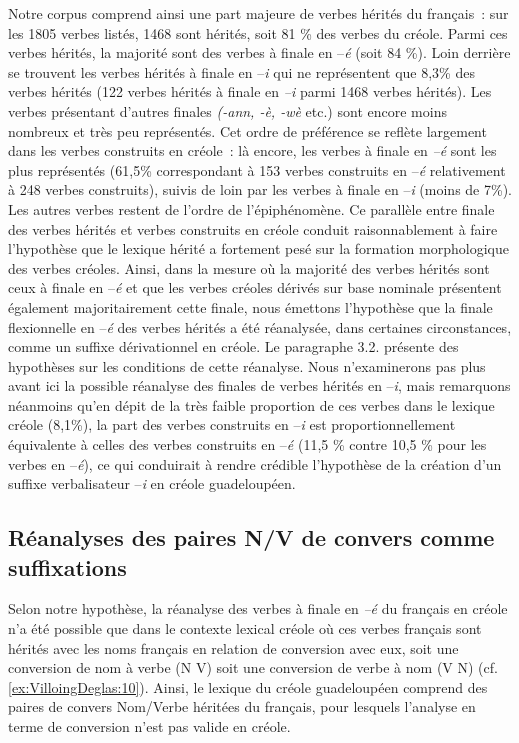 \documentclass[output=paper]{langsci/langscibook}
\begin{document}
Notre corpus comprend ainsi une part majeure de verbes hérités du
français~: sur les 1805 verbes listés, 1468 sont hérités, soit 81 \% des
verbes du créole. Parmi ces verbes hérités, la majorité sont des verbes
à finale en --\emph{é} (soit 84 \%). Loin derrière se trouvent les
verbes hérités à finale en --\emph{i} qui ne représentent que 8,3\% des
verbes hérités (122 verbes hérités à finale en \emph{--i }parmi 1468
verbes hérités). Les verbes présentant d'autres finales \emph{(-ann, -è,
-wè} etc.) sont encore moins nombreux et très peu représentés. Cet ordre
de préférence se reflète largement dans les verbes construits en
créole~: là encore, les verbes à finale en \emph{--é} sont les plus
représentés (61,5\% correspondant à 153 verbes construits en --\emph{é
}relativement à 248 verbes construits), suivis de loin par les verbes à
finale en --\emph{i} (moins de 7\%). Les autres verbes restent de
l'ordre de l'épiphénomène. Ce parallèle entre finale des verbes hérités
et verbes construits en créole conduit raisonnablement à faire
l'hypothèse que le lexique hérité a fortement pesé sur la formation
morphologique des verbes créoles. Ainsi, dans la mesure où la majorité
des verbes hérités sont ceux à finale en --\emph{é} et que les verbes
créoles dérivés sur base nominale présentent également majoritairement
cette finale, nous émettons l'hypothèse que la finale flexionnelle en
--\emph{é} des verbes hérités a été réanalysée, dans certaines
circonstances, comme un suffixe dérivationnel en créole. Le paragraphe
3.2. présente des hypothèses sur les conditions de cette réanalyse. Nous
n'examinerons pas plus avant ici la possible réanalyse des finales de
verbes hérités en --\emph{i}, mais remarquons néanmoins qu'en dépit de
la très faible proportion de ces verbes dans le lexique créole (8,1\%),
la part des verbes construits en --\emph{i} est proportionnellement
équivalente à celles des verbes construits en --\emph{é} (11,5 \% contre
10,5 \% pour les verbes en --\emph{é}), ce qui conduirait à rendre
crédible l'hypothèse de la création d'un suffixe verbalisateur
--\emph{i} en créole guadeloupéen.

\subsection{Réanalyses des paires N/V de convers comme
suffixations}\label{subsection:VilloingDeglas:réanalyses-des-paires-nv-de-convers-comme-suffixations}

Selon notre hypothèse, la réanalyse des verbes à finale en \emph{--é} du
français en créole n'a été possible que dans le contexte lexical créole
où ces verbes français sont hérités avec les noms français en relation
de conversion avec eux, soit une conversion de nom à verbe (N\textrightarrow{} V) soit
une conversion de verbe à nom (V\textrightarrow{} N) (cf. \ref{ex:VilloingDeglas:10}). Ainsi, le lexique du
créole guadeloupéen comprend des paires de convers Nom/Verbe héritées du
français, pour lesquels l'analyse en terme de conversion n'est pas
valide en créole.
\end{document}
